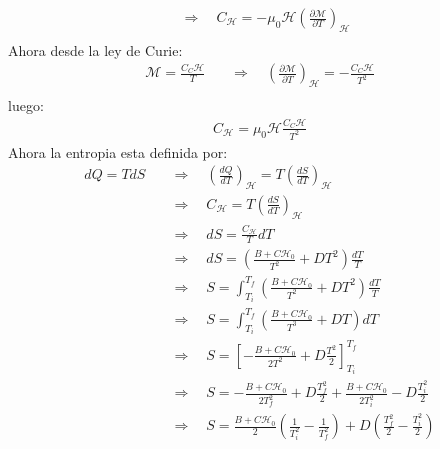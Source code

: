 \documentclass[a4paper]{article}
\begin{document}
\begin{answer}
\begin{align*}
            &\Rightarrow \quad C_{\mathscr{H}} = - \mu_0 \mathscr{H}  \left(\frac{\partial \mathscr{M}}{\partial T}\right)_{\mathscr{H}}\\  
        \end{align*}
        Ahora desde la ley de Curie:
        \begin{align*}
            \mathscr{M} = \frac{C_C \mathscr{H}}{T} \quad &\Rightarrow \quad \left(\frac{\partial \mathscr{M}}{\partial T}\right)_{\mathscr{H}} = -\frac{C_C \mathscr{H}}{T^2}\\
        \end{align*}
        luego:
        \begin{align*}
            C_{\mathscr{H}} = \mu_0 \mathscr{H}\frac{C_C \mathscr{H}}{T^2}
        \end{align*}
        Ahora la entropia esta definida por:
        \begin{align*}
            dQ = TdS \quad &\Rightarrow \quad \left( \frac{dQ}{dT}\right)_{\mathscr{H}} = T \left(\frac{dS}{dT}\right)_\mathscr{H}\\
            &\Rightarrow \quad C_{\mathscr{H}} = T \left(\frac{dS}{dT}\right)_{\mathscr{H}}\\
            &\Rightarrow \quad dS = \frac{C_{\mathscr{H}}}{T}dT\\
            &\Rightarrow \quad dS = \left(\frac{B+C \mathscr{H_0}}{T^2}+D T^2\right)\frac{dT}{T}\\
            &\Rightarrow \quad S = \int_{T_i}^{T_f} \left(\frac{B+C \mathscr{H_0}}{T^2}+D T^2\right)\frac{dT}{T}\\
            &\Rightarrow \quad S = \int_{T_i}^{T_f} \left(\frac{B+C \mathscr{H_0}}{T^3}+D T\right)dT\\
            &\Rightarrow \quad S = \left[-\frac{B+C \mathscr{H_0}}{2T^2}+D \frac{T^2}{2}\right]_{T_i}^{T_f}\\
            &\Rightarrow \quad S = -\frac{B+C \mathscr{H_0}}{2T_f^2}+D \frac{T_f^2}{2} + \frac{B+C \mathscr{H_0}}{2T_i^2}-D \frac{T_i^2}{2}\\
            &\Rightarrow \quad S = \frac{B+C \mathscr{H_0}}{2}\left(\frac{1}{T_i^2}-\frac{1}{T_f^2}\right)+D \left(\frac{T_f^2}{2} -\frac{T_i^2}{2}\right)\\
        \end{align*}
    \end{answer}
\end{document}
